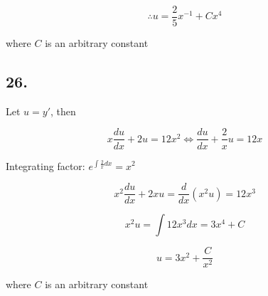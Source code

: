 \documentclass{article}
\begin{document}
  $$\therefore u = \frac 2 5 x^{-1} + Cx^4$$

  where $C$ is an arbitrary constant

  \subsection*{26. }

  Let $ u = y' $, then

  $$x \frac{du}{dx} + 2u = 12x^2 \iff \frac{du}{dx} + \frac 2 x u = 12x$$

  Integrating factor: $e^{\int \frac 2 x dx} = x^2$

  $$x^2 \frac{du}{dx} + 2x u = \frac{d}{dx}(x^2u) = 12x^3$$

  $$x^2 u = \int 12x^3 dx = 3x^4 + C$$

  $$ u = 3x^2 + \frac{C}{x^2}$$

  where $C$ is an arbitrary constant
\end{document}
